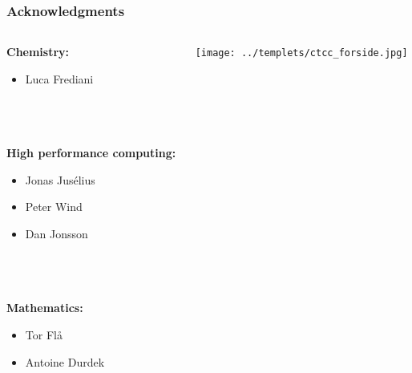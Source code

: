 \begin{frame}
    \frametitle{Acknowledgments}
    \large
    \begin{columns}
    \begin{column}[b]{0.5\linewidth}
    \textbf{Chemistry:}
    \begin{itemize}
	\item Luca Frediani
    \end{itemize}
    \ \\
    \ \\
    \ \\
    \textbf{High performance computing:}
    \begin{itemize}
    	\item Jonas Jus\'{e}lius
    	\item Peter Wind
    	\item Dan Jonsson
    \end{itemize}
    \ \\
    \ \\
    \ \\
    \textbf{Mathematics:}
    \begin{itemize}
	\item Tor Fl\aa
	\item Antoine Durdek
    \end{itemize}
    \end{column}
    \begin{column}[b]{0.5\linewidth}
	\centering

	\texttt{[image: ../templets/ctcc\_forside.jpg]}\\

        \vspace{10mm}


\end{column}
\end{columns}
\end{frame}
